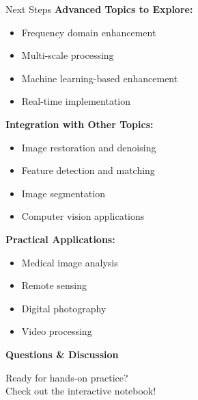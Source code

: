 \documentclass[aspectratio=169,10pt]{beamer}
\begin{document}
\begin{frame}{Next Steps}
\textbf{Advanced Topics to Explore:}
\begin{itemize}
\item Frequency domain enhancement
\item Multi-scale processing
\item Machine learning-based enhancement
\item Real-time implementation
\end{itemize}

\textbf{Integration with Other Topics:}
\begin{itemize}
\item Image restoration and denoising
\item Feature detection and matching
\item Image segmentation
\item Computer vision applications
\end{itemize}

\textbf{Practical Applications:}
\begin{itemize}
\item Medical image analysis
\item Remote sensing
\item Digital photography
\item Video processing
\end{itemize}
\end{frame}

\begin{frame}[standout]
\Large
\textbf{Questions \& Discussion}

\vspace{1cm}
\normalsize
Ready for hands-on practice?\\
Check out the interactive notebook!
\end{frame}
\end{document}
